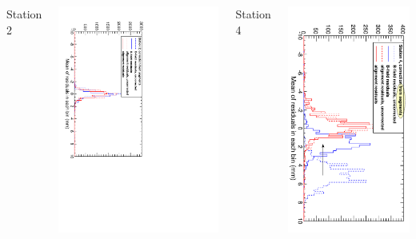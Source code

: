 \documentclass[compress]{beamer}
\begin{document}
\begin{frame}
\begin{columns}
Station 2

\includegraphics[height=\linewidth, angle=90]{scaling_corrections_station2.pdf}

\vspace{1 cm}
Station 4

\includegraphics[height=\linewidth, angle=90]{scaling_corrections_station4.pdf}
\end{columns}
\end{frame}
\end{document}

